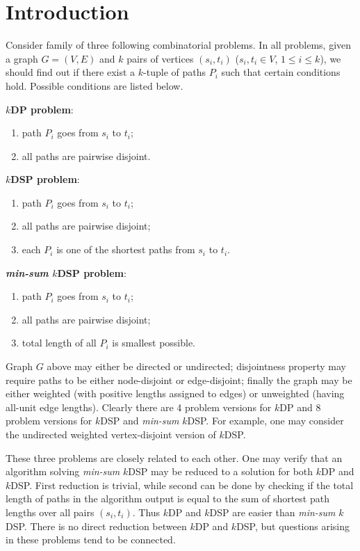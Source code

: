 \section{Introduction}

Consider family of three following combinatorial problems. In all problems, given a graph $G = (V, E)$ and $k$ pairs of vertices $(s_i, t_i)$ ($s_i, t_i \in V$, $1 \leq i \leq k$), we should find out if there exist a $k$-tuple of paths $P_i$ such that certain conditions hold. Possible conditions are listed below.

\textbf{$k$DP problem}:
\begin{enumerate}[leftmargin=1.5cm,topsep=0cm]
    \item path $P_i$ goes from $s_i$ to $t_i$;
    \item all paths are pairwise disjoint.
\end{enumerate}

\textbf{$k$DSP problem}: 
\begin{enumerate}[leftmargin=1.5cm,topsep=0cm]
    \item path $P_i$ goes from $s_i$ to $t_i$;
    \item all paths are pairwise disjoint;
    \item each $P_i$ is one of the shortest paths from $s_i$ to $t_i$.
\end{enumerate}

\textbf{\textit{min-sum} $k$DSP problem}: 
\begin{enumerate}[leftmargin=1.5cm,topsep=0cm] 
    \item path $P_i$ goes from $s_i$ to $t_i$;
    \item all paths are pairwise disjoint;
    \item total length of all $P_i$ is smallest possible.
\end{enumerate}

Graph $G$ above may either be directed or undirected; disjointness property may require paths to be either node-disjoint or edge-disjoint; finally the graph may be either weighted (with positive lengths assigned to edges) or unweighted (having all-unit edge lengths). Clearly there are 4 problem versions for $k$DP and 8 problem versions for $k$DSP and \textit{min-sum} $k$DSP. For example, one may consider the undirected weighted vertex-disjoint version of $k$DSP.

These three problems are closely related to each other. One may verify that an algorithm solving \textit{min-sum} $k$DSP may be reduced to a solution for both $k$DP and $k$DSP. First reduction is trivial, while second can be done by checking if the total length of paths in the algorithm output is equal to the sum of shortest path lengths over all pairs $(s_i, t_i)$. Thus $k$DP and $k$DSP are easier than \textit{min-sum} $k$DSP. There is no direct reduction between $k$DP and $k$DSP, but questions arising in these problems tend to be connected.

